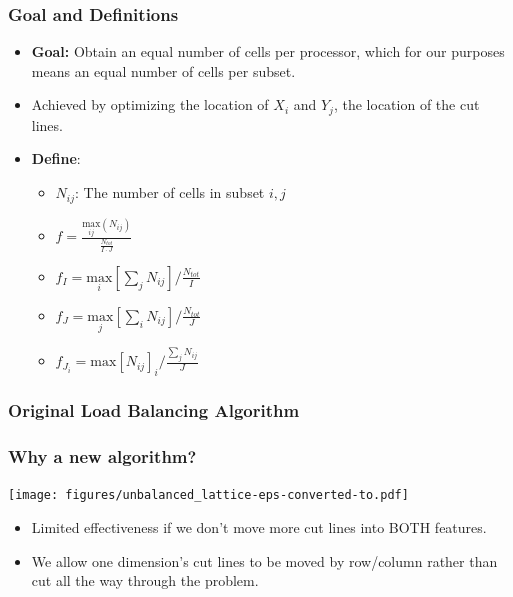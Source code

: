 \documentclass[compress]{beamer}
\begin{document}
\begin{frame}[t]\frametitle{ Goal and Definitions}
	\begin{block}{}
	
		\begin{itemize}
			\item \textbf{Goal:} Obtain an equal number of cells per processor, which for our purposes means an equal number of cells per subset.
			\item Achieved by optimizing the location of $X_i$ and $Y_j$, the location of the cut lines.
			\item \textbf{Define}:
			\begin{itemize}
			\item $N_{ij}$: The number of cells  in subset ${i,j}$
			\item $f =\frac{\underset{ij}{\text{max}}(N_{ij})}{\frac{N_{tot}}{I\cdot J}}$
			\item $f_I = \underset{i}{\text{max}}[\sum_{j} N_{ij}]/\frac{N_{tot}}{I}$
			\item $f_J = \underset{j}{\text{max}}[\sum_{i} N_{ij}]/\frac{N_{tot}}{J}$
			\item $f_{J_i} = \text{max}[N_{ij}]_i/\frac{\sum_{j}N_{ij}}{J}$
			\end{itemize}
		\end{itemize}
	\end{block}
\end{frame}

\begin{frame}[t]\frametitle{Original Load Balancing Algorithm}
\vspace{-0.5 cm}
\begin{block}{}

\end{block}
\end{frame}

\begin{frame}[t]\frametitle{Why a new algorithm?}
\centering
\texttt{[image: figures/unbalanced\_lattice-eps-converted-to.pdf]}
\begin{block}{}
\begin{itemize}
\item Limited effectiveness if we don't move more cut lines into BOTH features.
\item We allow one dimension's cut lines to be moved by row/column rather than cut all the way through the problem. 
\end{itemize}
\end{block}
\end{frame}
\end{document}
